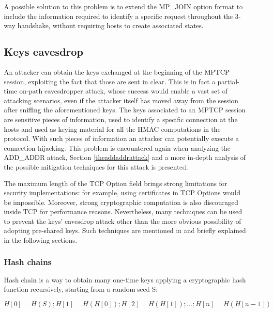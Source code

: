 A possible solution to this problem is to extend the MP\_JOIN option format to include the information required to identify a specific request throughout the 3-way handshake, without requiring hosts to create associated states.

\subsection{Keys eavesdrop}
An attacker can obtain the keys exchanged at the beginning of the MPTCP session, exploiting the fact that those are sent in clear. This is in fact a partial-time on-path eavesdropper attack, whose success would enable a vast set of attacking scenarios, even if the attacker itself has moved away from the session after sniffing the aforementioned keys.
The keys associated to an MPTCP session are sensitive pieces of information, used to identify a specific connection at the hosts and used as keying material for all the HMAC computations in the protocol. With such pieces of information an attacker can potentially execute a connection hijacking. This problem is encountered again when analyzing the ADD\_ADDR attack, Section \ref{theaddaddrattack} and a more in-depth analysis of the possible mitigation techniques for this attack is presented.

The maximum length of the TCP Option field brings strong limitations for security implementations: for example, using certificates in TCP Options would be impossible. Moreover, strong cryptographic computation is also discouraged inside TCP for performance reasons. Nevertheless, many techniques can be used to prevent the keys' eavesdrop attack other than the more obvious possibility of adopting pre-shared keys. Such techniques are mentioned in  and briefly explained in the following sections.

\subsubsection{Hash chains}
Hash chain is a way to obtain many one-time keys applying a cryptographic hash function recursively, starting from a random seed S:
  
  \[H[0] = H(S); H[1] = H(H[0]); H[2] = H(H[1]); ...; H[n] = H(H[n-1])\]
  
